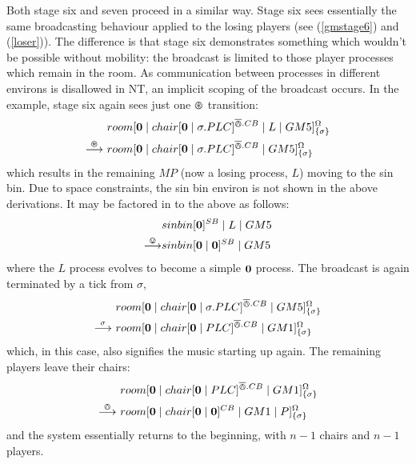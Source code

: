 Both stage six and seven proceed in a similar way.  Stage six sees
essentially the same broadcasting behaviour applied to the losing
players (see (\ref{gmstage6}) and (\ref{loser})).  The difference is
that stage six demonstrates something which wouldn't be possible without
mobility: the broadcast is limited to those player processes which
remain in the room.  As communication between processes in different
environs is disallowed in NT, an implicit scoping of the broadcast
occurs.  In the example, stage six again sees just one $\varoast$
transition:
\begin{equation}
\begin{aligned}
&  {room}[ \textbf{0} \;|\; {chair}[ \textbf{0} \;|\; \sigma.PLC ]^{\overline{\varowedge}.CB} \;|\; 
   L \;|\;
   GM5 ]^{\Omega}_{\{\sigma\}} \\
\stackrel{\varoast}{\longrightarrow}\ & {room}[ \textbf{0} \;|\; {chair}[ \textbf{0} \;|\; \sigma.PLC ]^{\overline{\varowedge}.CB} \;|\;
   GM5 ]^{\Omega}_{\{\sigma\}} \\
\end{aligned}
\end{equation}
which results in the remaining $MP$ (now a losing process, $L$) moving
to the sin bin.  Due to space constraints, the sin bin environ is not
shown in the above derivations.  It may be factored in to the above as
follows:
\begin{equation}
\begin{aligned}
& {sinbin}[ \textbf{0} ]^{SB} \;|\; L \;|\; GM5 \\
\stackrel{\varovee}{\longrightarrow} & {sinbin}[ \textbf{0} \;|\; \textbf{0} ]^{SB} \;|\; GM5
\end{aligned}
\end{equation}
 where the $L$ process evolves to become a simple $\textbf{0}$
process.  The broadcast is again terminated by a tick from $\sigma$,
\begin{equation}
\begin{aligned}
&  {room}[ \textbf{0} \;|\; {chair}[ \textbf{0} \;|\; \sigma.PLC ]^{\overline{\varowedge}.CB} \;|\;
   GM5 ]^{\Omega}_{\{\sigma\}} \\
\stackrel{\sigma}{\longrightarrow}\ & {room}[ \textbf{0} \;|\; {chair}[ \textbf{0} \;|\; PLC ]^{\overline{\varowedge}.CB} \;|\;
   GM1 ]^{\Omega}_{\{\sigma\}} 
\end{aligned}
\end{equation}
which, in this case, also signifies the music starting up again.  The
remaining players leave their chairs:
\begin{equation}
\begin{aligned}
& {room}[ \textbf{0} \;|\; {chair}[ \textbf{0} \;|\; PLC ]^{\overline{\varowedge}.CB} \;|\;
   GM1 ]^{\Omega}_{\{\sigma\}}   \\
\stackrel{\varowedge}{\longrightarrow}\ & {room}[ \textbf{0} \;|\; {chair}[ \textbf{0} \;|\; \textbf{0} ]^{CB} \;|\;
   GM1 \;|\; P ]^{\Omega}_{\{\sigma\}} 
\end{aligned}
\end{equation}
and the system essentially returns to the beginning, with $n -
1$ chairs and $n - 1$ players.

